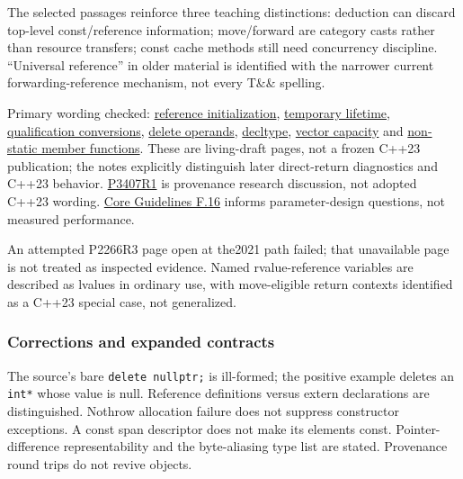 The selected passages reinforce three teaching distinctions: deduction can discard top-level const/reference information; move/forward are category casts rather than resource transfers; const cache methods still need concurrency discipline. ``Universal reference'' in older material is identified with the narrower current forwarding-reference mechanism, not every T\&\& spelling.

Primary wording checked: \href{https://eel.is/c++draft/dcl.init.ref}{reference initialization}, \href{https://eel.is/c++draft/class.temporary}{temporary lifetime}, \href{https://eel.is/c++draft/conv.qual}{qualification conversions}, \href{https://eel.is/c++draft/expr.delete}{delete operands}, \href{https://eel.is/c++draft/dcl.type.decltype}{decltype}, \href{https://eel.is/c++draft/vector.capacity}{vector capacity} and \href{https://eel.is/c++draft/class.mfct.non.static}{non-static member functions}. These are living-draft pages, not a frozen C++23 publication; the notes explicitly distinguish later direct-return diagnostics and C++23 behavior. \href{https://www.open-std.org/jtc1/sc22/wg21/docs/papers/2025/p3407r1.html}{P3407R1} is provenance research discussion, not adopted C++23 wording. \href{https://isocpp.github.io/CppCoreGuidelines/CppCoreGuidelines\#f16-for-in-parameters-pass-cheaply-copied-types-by-value-and-others-by-reference-to-const}{Core Guidelines F.16} informs parameter-design questions, not measured performance.

An attempted P2266R3 page open at the2021 path failed; that unavailable page is not treated as inspected evidence. Named rvalue-reference variables are described as lvalues in ordinary use, with move-eligible return contexts identified as a C++23 special case, not generalized.

\subsubsection{Corrections and expanded contracts}\label{appendix-a103e7846d21-corrections-and-expanded-contracts}

The source's bare \texttt{delete\ nullptr;} is ill-formed; the positive example deletes an \texttt{int*} whose value is null. Reference definitions versus extern declarations are distinguished. Nothrow allocation failure does not suppress constructor exceptions. A const span descriptor does not make its elements const. Pointer-difference representability and the byte-aliasing type list are stated. Provenance round trips do not revive objects.

